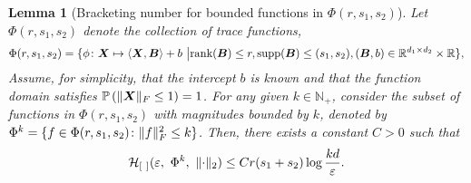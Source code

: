 \documentclass[11pt]{article}
\theoremstyle{plain}
\newtheorem{lem}{Lemma}
\theoremstyle{definition}
\begin{document}
\begin{lem}[Bracketing number for bounded functions in $\Phi(r,s_1,s_2)$]\label{lem:entropy}
Let $\Phi(r,s_1,s_2)$ denote the collection of trace functions, 
\begin{align*} %
\Phi(r,s_1,s_2)=\{\phi\colon \mX\mapsto \langle \mX, \mB \rangle +b \ \big| \text{rank}(\mB)\leq r,  \text{supp}(\mB)\leq (s_1,s_2), (\mB,b)\in\mathbb{R}^{d_1\times d_2}\times \mathbb{R}\},
\end{align*}
Assume, for simplicity, that the intercept $b$ is known and that the function domain satisfies $\mathbb{P}\left(\lVert\bm X\rVert_F\leq 1\right)=1$. For any given $k\in\mathbb{N}_{+}$, consider the subset of functions in $\Phi(r,s_1,s_2)$ with magnitudes bounded by $k$, denoted by $\Phi^k=\{f\in \Phi(r,s_1,s_2)\colon \lVert f\rVert_F^2\leq k\}$. Then, there exists a constant $C>0$ such that
\[
\mathcal{H}_{[\ ]}(\varepsilon,\ \Phi^k,\ \lVert\cdot\rVert_2) \leq  Cr(s_1+s_2) \log {kd\over \varepsilon }.
\]
\end{lem}
\end{document}
